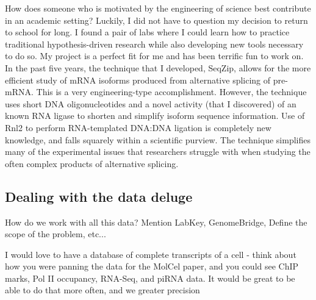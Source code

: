     How does someone who is motivated by the engineering of science best contribute in an academic setting? Luckily, I did not have to question my decision to return to school for long. I found a pair of labs where I could learn how to practice traditional hypothesis-driven research while also developing new tools necessary to do so. My project is a perfect fit for me and has been terrific fun to work on. In the past five years, the technique that I developed, SeqZip, allows for the more efficient study of  mRNA isoforms produced from alternative splicing of pre-mRNA. This is a very engineering-type accomplishment. However, the technique uses short DNA oligonucleotides and a novel activity (that I discovered) of an known RNA ligase to shorten and simplify isoform sequence information. Use of Rnl2 to perform RNA-templated DNA:DNA ligation is completely new knowledge, and falls squarely within a scientific purview. The technique simplifies many of the experimental issues that researchers struggle with when studying the often complex products of alternative splicing.
    
    
  \subsection{Dealing with the data deluge}\label{Disc:subsec:Dealing with Data Deluge}


    How do we work with all this data? Mention LabKey, GenomeBridge, Define the scope of the problem, etc...

    I would love to have a database of complete transcripts of a cell - think about how you were panning the data for the MolCel paper, and you could see ChIP marks, Pol II occupancy, RNA-Seq, and piRNA data. It would be great to be able to do that more often, and we greater precision
